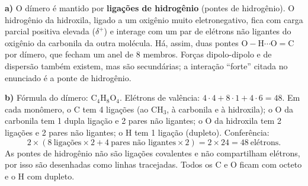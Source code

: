 \documentclass{article}%
\begin{document}
\textbf{a)} O dímero é mantido por \textbf{ligações de hidrogênio} (pontes de hidrogênio). O hidrogênio da hidroxila, ligado a um oxigênio muito eletronegativo, fica com carga parcial positiva elevada ($\delta^+$) e interage com um par de elétrons não ligantes do oxigênio da carbonila da outra molécula. Há, assim, duas pontes $\mathrm{O{-}H\cdots O{=}C}$ por dímero, que fecham um anel de 8 membros. Forças dipolo-dipolo e de dispersão também existem, mas são secundárias; a interação ``forte'' citada no enunciado é a ponte de hidrogênio.

\textbf{b)} Fórmula do dímero: $\mathrm{C_4H_8O_4}$. Elétrons de valência: $4\cdot4+8\cdot1+4\cdot6=48$. Em cada monômero, o C tem 4 ligações (ao $\mathrm{CH_3}$, à carbonila e à hidroxila); o O da carbonila tem 1 dupla ligação e 2 pares não ligantes; o O da hidroxila tem 2 ligações e 2 pares não ligantes; o H tem 1 ligação (dupleto). Conferência:
\[
2\times\left(8\ \text{ligações}\times2+4\ \text{pares não ligantes}\times2\right)=2\times24=48\ \text{elétrons}.
\]
As pontes de hidrogênio não são ligações covalentes e não compartilham elétrons, por isso são desenhadas como linhas tracejadas. Todos os C e O ficam com octeto e o H com dupleto.
\end{document}
